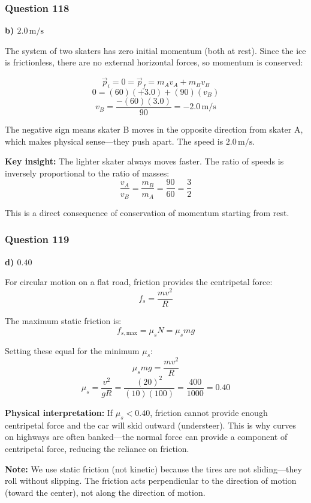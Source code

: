 \documentclass[12pt,letterpaper]{article}
\begin{document}
\subsubsection*{Question 118}

\begin{answerbox}
\textbf{b) $2.0\,\text{m/s}$}
\end{answerbox}

\begin{explanationbox}
The system of two skaters has zero initial momentum (both at rest). Since the ice is frictionless, there are no external horizontal forces, so momentum is conserved:

\[
\vec{p}_i = 0 = \vec{p}_f = m_A v_A + m_B v_B
\]
\[
0 = (60)(+3.0) + (90)(v_B)
\]
\[
v_B = \frac{-(60)(3.0)}{90} = -2.0\,\text{m/s}
\]

The negative sign means skater B moves in the opposite direction from skater A, which makes physical sense---they push apart. The speed is $2.0\,\text{m/s}$.

\textbf{Key insight:} The lighter skater always moves faster. The ratio of speeds is inversely proportional to the ratio of masses:
\[
\frac{v_A}{v_B} = \frac{m_B}{m_A} = \frac{90}{60} = \frac{3}{2}
\]

This is a direct consequence of conservation of momentum starting from rest.
\end{explanationbox}

\subsubsection*{Question 119}

\begin{answerbox}
\textbf{d) $0.40$}
\end{answerbox}

\begin{explanationbox}
For circular motion on a flat road, friction provides the centripetal force:
\[
f_s = \frac{mv^2}{R}
\]

The maximum static friction is:
\[
f_{s,\text{max}} = \mu_s N = \mu_s mg
\]

Setting these equal for the minimum $\mu_s$:
\[
\mu_s mg = \frac{mv^2}{R}
\]
\[
\mu_s = \frac{v^2}{gR} = \frac{(20)^2}{(10)(100)} = \frac{400}{1000} = 0.40
\]

\textbf{Physical interpretation:} If $\mu_s < 0.40$, friction cannot provide enough centripetal force and the car will skid outward (understeer). This is why curves on highways are often banked---the normal force can provide a component of centripetal force, reducing the reliance on friction.

\textbf{Note:} We use static friction (not kinetic) because the tires are not sliding---they roll without slipping. The friction acts perpendicular to the direction of motion (toward the center), not along the direction of motion.
\end{explanationbox}
\end{document}
